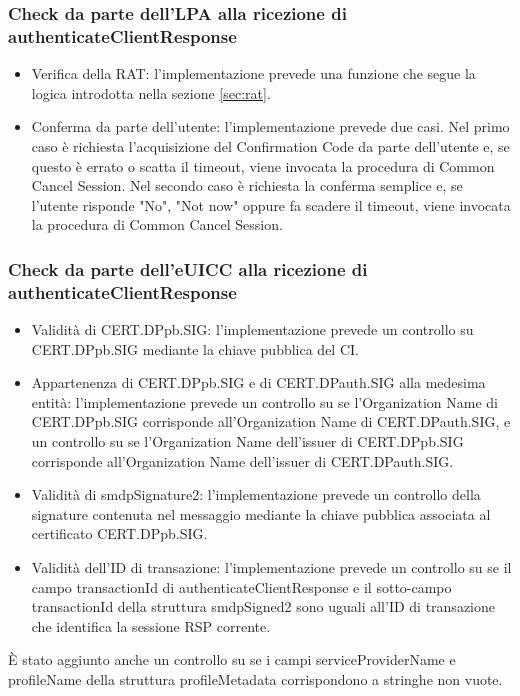 \documentclass[10pt, oneside]{book}
\begin{document}
\subsubsection{Check da parte dell'LPA alla ricezione di authenticateClientResponse}
\begin{itemize}
\item Verifica della RAT: l'implementazione prevede una funzione che segue la logica introdotta nella sezione \ref{sec:rat}.
\item Conferma da parte dell'utente: l'implementazione prevede due casi. Nel primo caso è richiesta l'acquisizione del Confirmation Code da parte dell'utente e, se questo è errato o scatta il timeout, viene invocata la procedura di Common Cancel Session. Nel secondo caso è richiesta la conferma semplice e, se l'utente risponde "No", "Not now" oppure fa scadere il timeout, viene invocata la procedura di Common Cancel Session.
\end{itemize}

\subsubsection{Check da parte dell'eUICC alla ricezione di authenticateClientResponse}
\begin{itemize}
\item Validità di CERT.DPpb.SIG: l'implementazione prevede un controllo su CERT.DPpb.SIG mediante la chiave pubblica del CI.
\item Appartenenza di CERT.DPpb.SIG e di CERT.DPauth.SIG alla medesima entità: l'implementazione prevede un controllo su se l'Organization Name di CERT.DPpb.SIG corrisponde all'Organization Name di CERT.DPauth.SIG, e un controllo su se l'Organization Name dell'issuer di CERT.DPpb.SIG corrisponde all'Organization Name dell'issuer di CERT.DPauth.SIG.
\item Validità di smdpSignature2: l'implementazione prevede un controllo della signature contenuta nel messaggio mediante la chiave pubblica associata al certificato CERT.DPpb.SIG.
\item Validità dell'ID di transazione: l'implementazione prevede un controllo su se il campo transactionId di authenticateClientResponse e il sotto-campo transactionId della struttura smdpSigned2 sono uguali all'ID di transazione che identifica la sessione RSP corrente.
\end{itemize}
È stato aggiunto anche un controllo su se i campi serviceProviderName e profileName della struttura profileMetadata corrispondono a stringhe non vuote.
\end{document}
